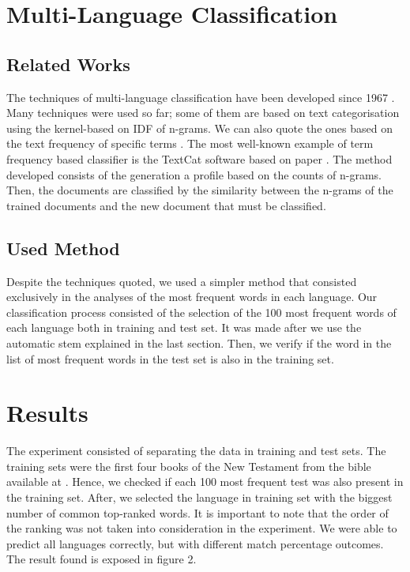 \documentclass[12pt]{article}
\begin{document}
\section{Multi-Language Classification}\label{sec:multi-language-classification}

\subsection{Related Works}
   The techniques of multi-language classification have been developed since 1967 \cite{cabral_2015}. Many techniques were used so far; some of them are based on text categorisation using the kernel-based on IDF of n-grams. We can also quote the ones based on the text frequency of specific terms \cite{cabral_2015}.  
   The most well-known example of term frequency based classifier is the TextCat software based on paper \cite{cavnar1994n}. The method developed consists of the generation a profile based on the counts of n-grams. Then, the documents are classified by the similarity between the n-grams of the trained documents and the new document that must be classified.
\subsection{Used Method}
    Despite the techniques quoted, we used a simpler method that consisted exclusively in the analyses of the most frequent words in each language.
    Our classification process consisted of the selection of the 100 most frequent words of each language both in training and test set. It was made after we use the automatic stem explained in the last section. 
    Then, we verify if the word in the list of most frequent words in the test set is also in the training set.  
  


    
\section{Results}\label{sec:results}


The experiment consisted of separating the data in training and test sets. The training sets were the first four books of the New Testament from the bible available at \cite{angelo}. 
Hence, we checked if each 100 most frequent test was also present in the training set. After, we selected the language in training set with the biggest number of common top-ranked words. It is important to note that the order of the ranking was not taken into consideration in the experiment. 
We were able to predict all languages correctly, but with different match percentage outcomes. The result found is exposed in figure 2.
\end{document}
